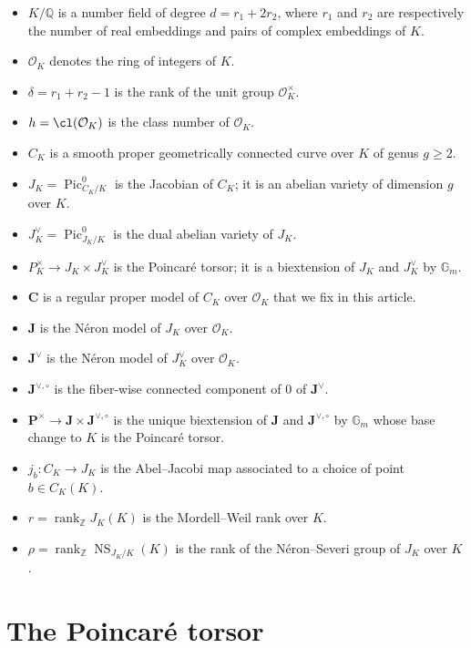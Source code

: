 \documentclass[11pt,oneside]{amsart}
\theoremstyle{plain}
\theoremstyle{definition}
\def\lra{{\longrightarrow}}
\def\G{{\bf G}}
\DeclareMathOperator{\NS}{NS}
\DeclareMathOperator{\Pic}{Pic}
\DeclareMathOperator{\rank}{rank} \DeclareMathOperator{\rig}{rig}
\def\Z{\mathbb{Z}}
\def\Q{\mathbb{Q}}
\def\J{\mathbf{J}}
\def\Jo{\mathbf{J}^{\vee,\circ}}
\def\G{\mathbb{G}}
\def\CC{\mathbf{C}}
\def\oh{\mathcal{O}}
\begin{document}
\begin{itemize}
\item $K/\Q$ is a number field of degree $d=r_1+2r_2$, where $r_1$ and $r_2$ are respectively the number of real embeddings and pairs of complex embeddings of $K$. 
\item $\oh_K$ denotes the ring of integers of $K$. 
\item $\delta=r_1+r_2-1$ is the rank of the unit group $\oh_K^\times$. 
\item $h=\cl(\oh_K)$ is the class number of $\oh_K$. 
\item $C_K$ is a smooth proper geometrically connected curve over $K$ of genus $g\geq 2$. 
\item $J_K=\Pic^0_{C_K/K}$ is the Jacobian of $C_K$; it is an abelian variety of dimension $g$ over $K$.
\item $J^{\vee}_{K}=\Pic^0_{J_K/K}$ is the dual abelian variety of $J_K$.
\item $P^\times_K\lra J_K\times J_K^\vee$ is the Poincar\'e torsor; it is a biextension of $J_K$ and $J_K^\vee$ by $\G_m$.
\item $\CC$ is a regular proper model of $C_K$ over $\oh_K$ that we fix in this article.
\item $\J$ is the N\'eron model of $J_K$ over $\oh_K$.
\item $\J^\vee$ is the N\'eron model of $J_K^\vee$ over $\oh_K$.
\item $\Jo$ is the fiber-wise connected component of $0$ of $\J^\vee$.
\item $\mathbf{P}^\times\lra \J\times \Jo$ is the unique biextension of $\J$ and $\Jo$ by $\G_m$ whose base change to $K$ is the Poincar\'e torsor.
\item $j_b : C_K\lra J_K$ is the Abel--Jacobi map associated to a choice of point $b\in C_K(K)$.
\item $r=\rank_{\Z} J_K(K)$ is the Mordell--Weil rank over $K$.
\item $\rho=\rank_{\Z} \NS_{J_K/K}(K)$ is the rank of the N\'eron--Severi group of $J_K$ over $K$.
\end{itemize}
 
 
 






\section{The Poincar\'e torsor} \label{s:torsor}
\end{document}

